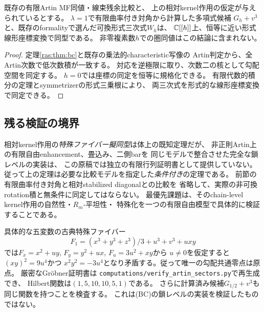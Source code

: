 \begin{corollary}[混合族に関する条件付き正式]\label{ras:cor:formal-G}
既存の有限Artin MF同値・線束残余比較と、
上の相対kernel作用の仮定が与えられているとする。
$\lambda=1$で有限曲率付き対角から計算した多項式候補
$G_h+v^3$と、既存のformalityで選んだ可換形式三次式$W_h$は、
$\mathbb C[[h]]$上、恒等に近い形式線形座標変換で同型である。
非零複素数$h$での圏同値はこの結論に含まれない。
\end{corollary}
\begin{proof}
定理\ref{ras:thm:bc}と既存の乗法的characteristic写像の
Artin判定から、全Artin次数で低次数積が一致する。
対応を逆極限に取り、次数二の核として勾配空間を同定する。
$h=0$では座標の同定を恒等に規格化できる。
有限代数的積分の定理とsymmetrizerの形式三乗根により、
両三次式を形式的な線形座標変換で同定できる。
\end{proof}

\subsection{残る検証の境界}

相対kernel作用の\emph{特殊ファイバー擬同型}は体上の既知定理だが、
非正則Artin上の有限自由enhancement、畳込み、二側barを
同じモデルで整合させた完全な鎖レベルの実装は、
この原稿では独立の有限行列証明書として提供していない。
従って上の定理は必要な比較モデルを指定した\emph{条件付き}の定理である。
前節の有限曲率付き対角と相対stabilized diagonalとの比較を
省略して、実際の非可換rotation積と無条件に同定してはならない。
最優先課題は、そのchain-level kernel作用の自然性・$R_m$-平坦性・
特殊化を一つの有限自由模型で具体的に検証することである。

具体的な五変数の古典特殊ファイバー
\[
 F_1=(x^3+y^3+z^3)/3+u^3+v^3+uxy
\]
では$F_x=x^2+uy$, $F_y=y^2+ux$, $F_u=3u^2+xy$から
$u\ne0$を仮定すると$(xy)^2=9u^4$かつ
$x^2y^2=-3u^4$となり矛盾する。従って唯一の勾配共通零点は原点。
厳密なGr\"obner証明書は
\texttt{computations/verify\_artin\_sectors.py}で再生成でき、
Hilbert関数は$(1,5,10,10,5,1)$である。
さらに計算済み候補$G_{1/2}+v^3$も同じ関数を持つことを検査する。
これは(BC)の鎖レベルの実装を検証したものではない。
